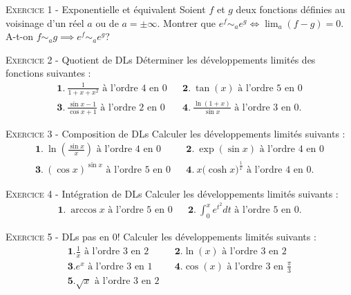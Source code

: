\documentclass[11pt]{article}
\begin{document}
 

\begin{center}\textsc{{\huge }}\end{center}



\vskip0.3cm\noindent\textsc{Exercice 1} - Exponentielle et équivalent
\vskip0.2cm
Soient $f$ et $g$ deux fonctions définies au voisinage d'un réel $a$ ou de $a=\pm\infty$. Montrer que
$e^f\sim_a e^g\iff \lim_a(f-g)=0$.
A-t-on $f\sim_a g\implies e^f\sim_a e^g$?




\vskip0.3cm\noindent\textsc{Exercice 2} - Quotient de DLs
\vskip0.2cm
Déterminer les développements limités des fonctions suivantes :
$$\begin{array}{lcl}
\displaystyle \mathbf 1.\ \frac{1}{1+x+x^2}\textrm{ à l'ordre 4 en 0}&&\displaystyle \mathbf 2.\ \tan(x)\textrm{ à l'ordre 5 en 0}\\
\displaystyle \mathbf 3.\ \frac{\sin x-1}{\cos x+1}\textrm{ à l'ordre 2 en 0}&&\displaystyle \mathbf 4.\ \frac{\ln(1+x)}{\sin x}\textrm{ à l'ordre 3 en 0}.
\end{array}$$




\vskip0.3cm\noindent\textsc{Exercice 3} - Composition de DLs
\vskip0.2cm
Calculer les développements limités suivants :
$$\begin{array}{lcl}
\displaystyle \mathbf 1.\ \ln\left(\frac{\sin x}{x}\right)\textrm{ à l'ordre 4 en 0}&&
\displaystyle \mathbf 2.\ \exp(\sin x)\textrm{ à l'ordre 4 en 0}\\
\displaystyle \mathbf 3.\ (\cos x)^{\sin x}\textrm{ à l'ordre 5 en 0}&&
\displaystyle \mathbf 4.\ x\big(\cosh x\big)^{\frac 1x}\textrm{ à l'ordre 4 en 0}.
\end{array}$$




\vskip0.3cm\noindent\textsc{Exercice 4} - Intégration de DLs
\vskip0.2cm
Calculer les développements limités suivants :
$$\begin{array}{lcl}
\displaystyle \mathbf 1.\ \arccos x\textrm{ à l'ordre 5 en 0}&&
\displaystyle \mathbf 2.\ \int_0^x e^{t^2}dt\textrm{ à l'ordre 5 en 0}.
\end{array}
$$




\vskip0.3cm\noindent\textsc{Exercice 5} - DLs pas en 0!
\vskip0.2cm
Calculer les développements limités suivants :
$$\begin{array}{lcl}
\mathbf 1. \frac 1x\textrm{ à l'ordre 3 en }2&&\displaystyle \mathbf 2. \ln(x)\textrm{ à l'ordre 3 en }2\\
\displaystyle \mathbf 3. e^x\textrm{ à l'ordre 3 en }1&&\displaystyle \mathbf 4. \cos(x)\textrm{ à l'ordre 3 en }\frac{\pi}3\\
\displaystyle \mathbf 5. \sqrt x\textrm{ à l'ordre 3 en 2}
\end{array}$$
\end{document}
